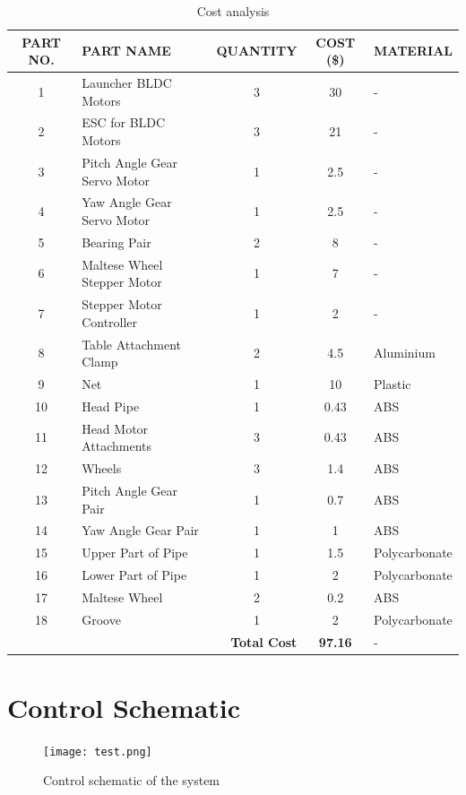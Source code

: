 \documentclass[12pt]{article}
\begin{document}
\begin{appendices}
\begin{table}[H]
\centering
\begin{tabular}{|c|l|c|c|l|}
\hline
\textbf{PART NO.} & \textbf{PART NAME}            & \textbf{QUANTITY} & \textbf{COST (\$)} & \textbf{MATERIAL}      \\ \hline
1  & Launcher BLDC Motors       & 3 & 30    & -                  \\ \hline
2  & ESC for BLDC Motors        & 3 & 21    & -                  \\ \hline
3  & Pitch Angle Gear Servo Motor & 1 & 2.5   & -                  \\ \hline
4  & Yaw Angle Gear Servo Motor & 1 & 2.5   & -                  \\ \hline
5  & Bearing Pair               & 2 & 8     & -                  \\ \hline
6  & Maltese Wheel Stepper Motor & 1 & 7     & -                  \\ \hline
7  & Stepper Motor Controller   & 1 & 2     & -                  \\ \hline
8  & Table Attachment Clamp     & 2 & 4.5   & Aluminium                  \\ \hline
9  & Net                        & 1 & 10    & Plastic                  \\ \hline
10 & Head Pipe                  & 1 & 0.43  & ABS                \\ \hline
11 & Head Motor Attachments     & 3 & 0.43  & ABS                \\ \hline
12 & Wheels                     & 3 & 1.4   & ABS                \\ \hline
13 & Pitch Angle Gear Pair      & 1 & 0.7   & ABS                \\ \hline
14 & Yaw Angle Gear Pair        & 1 & 1     & ABS                \\ \hline
15 & Upper Part of Pipe         & 1 & 1.5   & Polycarbonate      \\ \hline
16 & Lower Part of Pipe         & 1 & 2     & Polycarbonate      \\ \hline
17 & Maltese Wheel              & 2 & 0.2   & ABS                \\ \hline
18 & Groove                     & 1 & 2     & Polycarbonate      \\ \hline
\multicolumn{3}{|r|}{\textbf{Total Cost}} & \textbf{97.16} & - \\ \hline
\end{tabular}
\caption{Cost analysis}
\end{table}

\section{Control Schematic}
\begin{figure}[H]
    \centering
    \texttt{[image: test.png]} 
    \caption{Control schematic of the system}
    \label{fig:control-scheme}
\end{figure}


\end{appendices}
\end{document}
